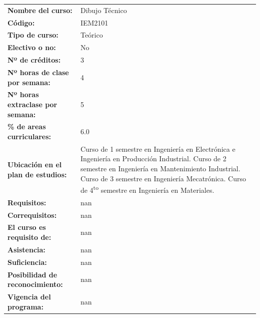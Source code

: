 \documentclass[letterpaper]{article}%
\begin{document}
\begin{longtable}{m{7cm}m{9cm}}%
\textbf{Nombre del curso:}&Dibujo Técnico\\%
\textbf{Código:}&IEM2101\\%
\textbf{Tipo de curso:}&Teórico\\%
\textbf{Electivo o no:}&No\\%
\textbf{Nº de créditos:}&3\\%
\textbf{Nº horas de clase por semana:}&4\\%
\textbf{Nº horas extraclase por semana:}&5\\%
\textbf{\% de areas curriculares:}&6.0\\%
\textbf{Ubicación en el plan de estudios:}&Curso de 1
 semestre en Ingeniería en Electrónica e Ingeniería en Producción Industrial. Curso de 2
 semestre en Ingeniería en Mantenimiento Industrial. Curso de 3
 semestre en Ingeniería Mecatrónica. Curso de 4\textsuperscript{to} semestre en Ingeniería en Materiales. \\%
\textbf{Requisitos:}&nan\\%
\textbf{Correquisitos:}&nan\\%
\textbf{El curso es requisito de:}&nan\\%
\textbf{Asistencia:}&nan\\%
\textbf{Suficiencia:}&nan\\%
\textbf{Posibilidad de reconocimiento:}&nan\\%
\textbf{Vigencia del programa:}&nan\\%
\end{longtable}%
\renewcommand{\arraystretch}{1.5}%
\end{document}
